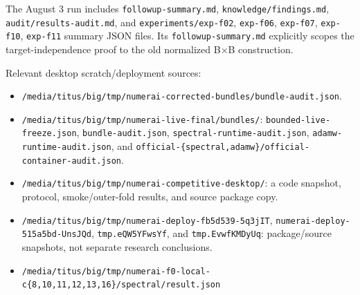 \documentclass[
  british,
  10pt,
  a4paper,
]{article}
\providecommand{\tightlist}{%
  \setlength{\itemsep}{0pt}\setlength{\parskip}{0pt}}
\begin{document}
The August 3 run includes
\texttt{followup-\allowbreak{}summary.\allowbreak{}md},
\texttt{knowledge/\allowbreak{}findings.\allowbreak{}md},
\texttt{audit/\allowbreak{}results-\allowbreak{}audit.\allowbreak{}md},
and \texttt{experiments/\allowbreak{}exp-\allowbreak{}f02},
\texttt{exp-f06}, \texttt{exp-f07}, \texttt{exp-f10}, \texttt{exp-f11}
summary JSON files. Its
\texttt{followup-\allowbreak{}summary.\allowbreak{}md} explicitly scopes
the target-\allowbreak{}independence\allowbreak{} proof to the old
normalized B×B construction\allowbreak{}.\allowbreak{}

Relevant desktop scratch/\allowbreak{}deployment sources:

\begin{itemize}
\tightlist
\item
  \texttt{/\allowbreak{}media/\allowbreak{}titus/\allowbreak{}big/\allowbreak{}tmp/\allowbreak{}numerai-\allowbreak{}corrected-\allowbreak{}bundles/\allowbreak{}bundle-\allowbreak{}audit.\allowbreak{}json}.
\item
  \texttt{/\allowbreak{}media/\allowbreak{}titus/\allowbreak{}big/\allowbreak{}tmp/\allowbreak{}numerai-\allowbreak{}live-\allowbreak{}final/\allowbreak{}bundles/\allowbreak{}}:
  \texttt{bounded-\allowbreak{}live-\allowbreak{}freeze.\allowbreak{}json},
  \texttt{bundle-\allowbreak{}audit.\allowbreak{}json},
  \texttt{spectral-\allowbreak{}runtime-\allowbreak{}audit.\allowbreak{}json},
  \texttt{adamw-\allowbreak{}runtime-\allowbreak{}audit.\allowbreak{}json},
  and
  \texttt{official-\allowbreak{}\{\allowbreak{}spectral,\allowbreak{}adamw\}\allowbreak{}/\allowbreak{}official-\allowbreak{}container-\allowbreak{}audit.\allowbreak{}json}.
\item
  \texttt{/\allowbreak{}media/\allowbreak{}titus/\allowbreak{}big/\allowbreak{}tmp/\allowbreak{}numerai-\allowbreak{}competitive-\allowbreak{}desktop/\allowbreak{}}:
  a code snapshot, protocol, smoke/\allowbreak{}outer-\allowbreak{}fold
  results, and source package copy.
\item
  \texttt{/\allowbreak{}media/\allowbreak{}titus/\allowbreak{}big/\allowbreak{}tmp/\allowbreak{}numerai-\allowbreak{}deploy-\allowbreak{}fb5d539-\allowbreak{}5q3jIT},
  \texttt{numerai-\allowbreak{}deploy-\allowbreak{}515a5bd-\allowbreak{}UnsJQd},
  \texttt{tmp.\allowbreak{}eQW5YFwsYf}, and
  \texttt{tmp.\allowbreak{}EvwfKMDyUq}: package/\allowbreak{}source
  snapshots, not separate research conclusions.\allowbreak{}
\item
  \texttt{/\allowbreak{}media/\allowbreak{}titus/\allowbreak{}big/\allowbreak{}tmp/\allowbreak{}numerai-\allowbreak{}f0-\allowbreak{}local-\allowbreak{}c\{\allowbreak{}8,\allowbreak{}10,\allowbreak{}11,\allowbreak{}12,\allowbreak{}13,\allowbreak{}16\}\allowbreak{}/\allowbreak{}spectral/\allowbreak{}result.\allowbreak{}json}

\end{itemize}
\end{document}
